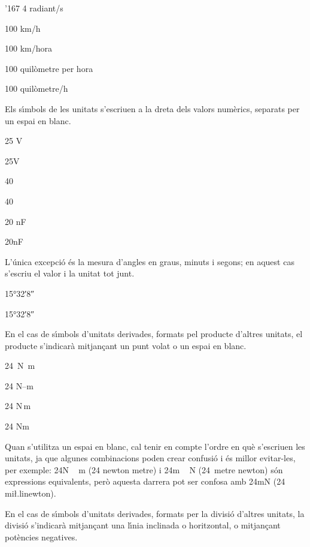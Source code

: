 \begin{dinglist}{'167}
\textcolor{Red}{} 4 radiant/s

\textcolor{Green}{} 100 km/h

\textcolor{Red}{} 100 km/hora

\textcolor{Green}{} 100 quil\`{o}metre per hora

\textcolor{Red}{} 100 quil\`{o}metre/h


\item Els s\'{\i}mbols de les unitats s'escriuen a la dreta dels valors
num\`{e}rics, separats per un espai en blanc.

\textcolor{Green}{} 25 V

\textcolor{Red}{} 25V

\textcolor{Green}{} 40 \celsius

\textcolor{Red}{} 40\celsius

\textcolor{Green}{} 20 nF

\textcolor{Red}{} 20nF


 L'\'{u}nica excepci\'{o} \'{e}s la mesura d'angles en graus, minuts i segons; en aquest cas s'escriu el valor i la unitat tot junt.

\textcolor{Green}{} \ang{15;32;8}

\textcolor{Red}{} \ang[number-angle-product = \,]{15;32;8}

\item En el cas de s\'{\i}mbols d'unitats derivades, formats pel producte
d'altres unitats, el producte s'indicar\`{a} mitjan\c{c}ant un punt volat o
un espai en blanc.

\textcolor{Green}{} \SI{24}{N.m}

\textcolor{Red}{} 24 N--m

\textcolor{Green}{} 24 N\,m

\textcolor{Red}{} 24 Nm

Quan s'utilitza un espai en blanc, cal tenir en compte  l'ordre en qu\`{e} s'escriuen
les unitats, ja que algunes combinacions poden crear confusi\'{o} i
\'{e}s millor evitar-les, per exemple: 24\unit{N\,m} (24 newton metre) i
24\unit{m\,N} (24~metre newton) s\'{o}n expressions equivalents, per\`{o}
aquesta darrera pot ser confosa amb 24\unit{mN} (24 mi{\l.l}inewton).

\item En el cas de s\'{\i}mbols d'unitats derivades, formats per la divisi\'{o}
d'altres unitats, la divisi\'{o} s'indicar\`{a} mitjan\c{c}ant una l\'{\i}nia
inclinada o horitzontal, o mitjan\c{c}ant pot\`{e}ncies negatives.


\end{dinglist}
